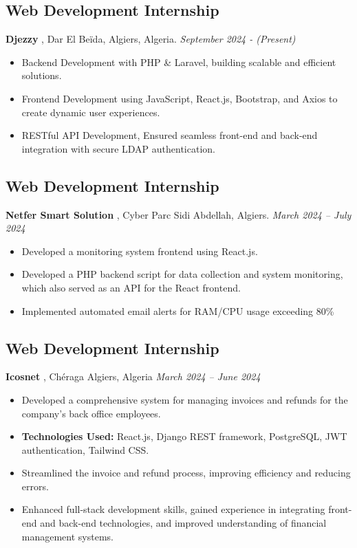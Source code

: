 \documentclass[a4paper,12pt]{article}
\begin{document}
\subsection*{Web Development Internship} 
\textbf{Djezzy }, Dar El Beïda, Algiers, Algeria.  \hfil
\textit{September 2024 - (Present) } \\
\begin{itemize}
     
  \item Backend Development with PHP \& Laravel, building scalable and efficient solutions.
  \item Frontend Development using JavaScript, React.js, Bootstrap, and Axios to create dynamic user experiences.
  \item RESTful API Development, Ensured seamless front-end and back-end integration with secure LDAP authentication.
\end{itemize}



\subsection*{Web Development Internship} 
\textbf{Netfer Smart Solution}  , Cyber Parc Sidi Abdellah, Algiers.  \hfil
\textit{March 2024 – July 2024} \\
\begin{itemize}
    \item Developed a monitoring system frontend using React.js.
    \item Developed a PHP backend script for data collection and system monitoring, which also served as an API for the React frontend.
    \item Implemented automated email alerts for RAM/CPU usage exceeding 80\%

\end{itemize}



\subsection*{Web Development Internship} 
\textbf{Icosnet} , Chéraga Algiers, Algeria \hfil
\textit{March 2024 – June 2024} \\
\begin{itemize}
    \item Developed a comprehensive system for managing invoices and refunds for the company’s back office employees.
    \item \textbf{Technologies Used:} React.js, Django REST framework, PostgreSQL, JWT authentication, Tailwind CSS.
    \item Streamlined the invoice and refund process, improving efficiency and reducing errors.
    \item Enhanced full-stack development skills, gained experience in integrating front-end and back-end technologies, and improved understanding of financial management systems.
\end{itemize}
\end{document}
